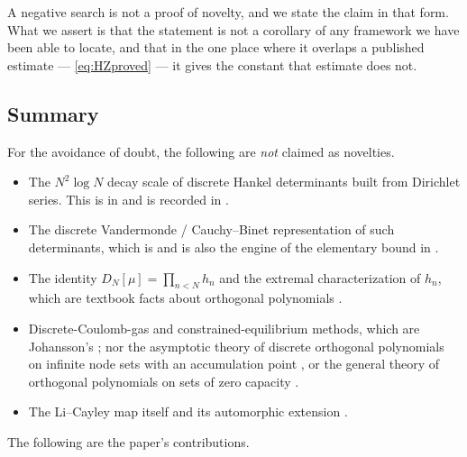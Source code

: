\documentclass[11pt]{amsart}
\numberwithin{equation}{section}
\theoremstyle{plain}
\theoremstyle{definition}
\theoremstyle{remark}
\begin{document}
A negative search is not a proof of novelty, and we state the claim in that form. What we assert is
that the statement is not a corollary of any framework we have been able to locate, and that in the
one place where it overlaps a published estimate --- \eqref{eq:HZproved} --- it gives the constant
that estimate does not.

\subsection{Summary}

For the avoidance of doubt, the following are \emph{not} claimed as novelties.

\begin{itemize}
\item The $N^{2}\log N$ decay scale of discrete Hankel determinants built from Dirichlet series.
This is in \cite{Monien2009} and is recorded in \cite{HaynesZudilin2015}.
\item The discrete Vandermonde / Cauchy--Binet representation of such determinants, which is
\cite{Monien2009} and is also the engine of the elementary bound in \cite{HaynesZudilin2015}.
\item The identity $D_{N}[\mu]=\prod_{n<N}h_{n}$ and the extremal characterization of $h_{n}$, which
are textbook facts about orthogonal polynomials \cite{Chihara1978}.
\item Discrete-Coulomb-gas and constrained-equilibrium methods, which are Johansson's
\cite{Johansson2001}; nor the asymptotic theory of discrete orthogonal polynomials on infinite node
sets with an accumulation point \cite{WuLinXuZhao2016}, or the general theory of orthogonal
polynomials on sets of zero capacity \cite{StahlTotik1992,Totik2005Orthogonal}.
\item The Li--Cayley map itself \cite{Li1997,BombieriLagarias1999} and its automorphic extension
\cite{Lagarias2007}.
\end{itemize}

The following are the paper's contributions.
\end{document}
